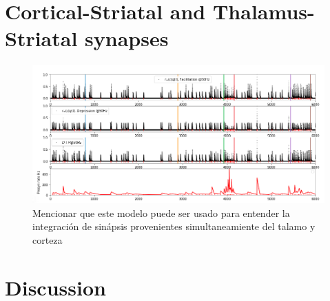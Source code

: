 \section{Cortical-Striatal and Thalamus-Striatal synapses}
\begin{figure}[h]
    \centering
    \includegraphics[scale = 0.45]{final.png}
    \caption{Mencionar que este modelo puede ser usado para entender la integración de sinápsis  provenientes simultaneamiente del talamo y corteza}
    \label{fig:my_label}
\end{figure}
\section{Discussion}
